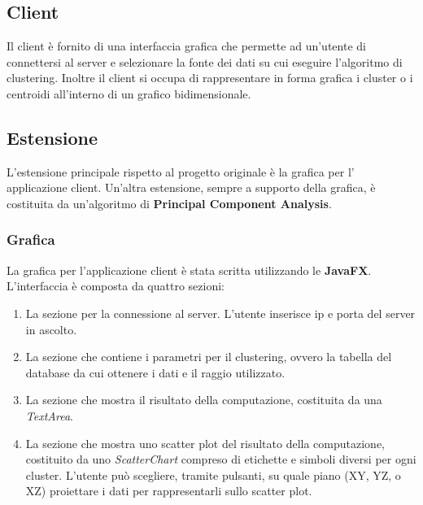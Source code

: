 \documentclass{article}
\begin{document}
	\subsection{Client}
	Il client è fornito di una interfaccia grafica che permette ad un'utente
	di connettersi al server e selezionare la fonte dei dati su cui eseguire
	l'algoritmo di clustering. Inoltre il client si occupa di rappresentare
	in forma grafica i cluster o i centroidi all'interno di un grafico
	bidimensionale.

	\subsection{Estensione}
	L'estensione principale rispetto al progetto originale è la grafica per
	l' applicazione client. Un'altra estensione, sempre a supporto della
	grafica, è costituita da un'algoritmo di \textbf{Principal Component
	Analysis}.

	\subsubsection{Grafica}
	La grafica per l'applicazione client è stata scritta utilizzando le
	\textbf{JavaFX}. L'interfaccia è composta da quattro sezioni:
	\begin{enumerate}
		\item La sezione per la connessione al server. L'utente
		inserisce ip e porta del server in ascolto.
		\item La sezione che contiene i parametri per il clustering,
		ovvero la tabella del database da cui ottenere i dati e il
		raggio utilizzato.
		\item La sezione che mostra il risultato della computazione,
		costituita da una \textit{TextArea}.
		\item La sezione che mostra uno scatter plot del risultato della
		computazione, costituito da uno \textit{ScatterChart} compreso
		di etichette e simboli diversi per ogni cluster. L'utente può
		scegliere, tramite pulsanti, su quale piano (XY, YZ, o XZ)
		proiettare i dati per rappresentarli sullo scatter plot.
	\end{enumerate}
\end{document}
